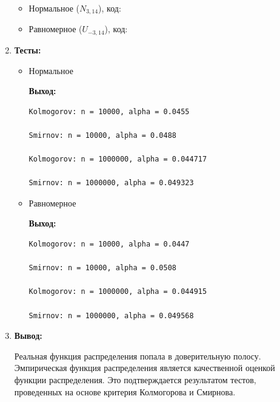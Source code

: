 \documentclass{article}
\begin{document}
\begin{enumerate}
		\begin{itemize}
			\item Нормальное ($N_{3,14}$), код:
			

			\item Равномерное ($U_{-3,14}$), код:
			
			
		\end{itemize}
		\item {\bf Тесты:}
		
		\begin{itemize}
			\item Нормальное
			
			
			{\bf Выход:}
			
			\begin{lstlisting}
Kolmogorov: n = 10000, alpha = 0.0455

Smirnov: n = 10000, alpha = 0.0488

Kolmogorov: n = 1000000, alpha = 0.044717

Smirnov: n = 1000000, alpha = 0.049323\end{lstlisting}
			
			\item Равномерное
			
			
			{\bf Выход:}
			
			\begin{lstlisting}
Kolmogorov: n = 10000, alpha = 0.0447

Smirnov: n = 10000, alpha = 0.0508

Kolmogorov: n = 1000000, alpha = 0.044915

Smirnov: n = 1000000, alpha = 0.049568\end{lstlisting}
		\end{itemize}
		
		\item {\bf  Вывод:}
		
		Реальная функция распределения попала в доверительную полосу.\\
		Эмпирическая функция распределения является качественной оценкой функции распределения. Это подтверждается результатом тестов, проведенных на основе критерия Колмогорова и Смирнова.
		
	\end{enumerate}
\end{document}
